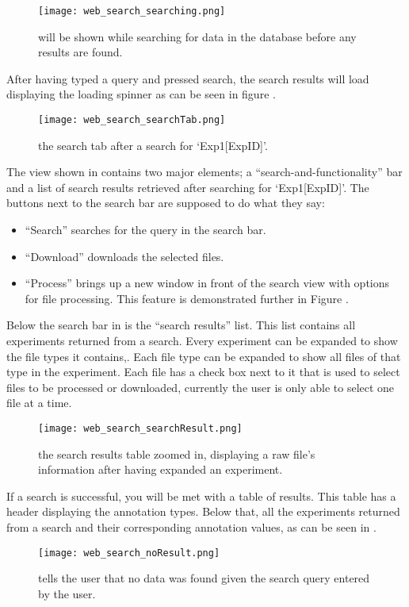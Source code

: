 \begin{figure}[h]
\centering
\texttt{[image: web\_search\_searching.png]}
\caption{\label{fig:web_search_searching}will be shown while searching for data in the database before any results are found.}
\end{figure}

After having typed a query and pressed search, the search results will load displaying the loading spinner as can be seen in figure .
\begin{figure}[h]
\centering
\texttt{[image: web\_search\_searchTab.png]}
\caption{\label{fig:web_search_searchTab}the search tab after a search for ‘Exp1[ExpID]’.}
\end{figure}

The view shown in  contains two major elements; a “search-and-functionality” bar and a list of search results retrieved after searching for ‘Exp1[ExpID]’. The buttons next to the search bar are supposed to do what they say: 
\begin{itemize}
	\item “Search” searches for the query in the search bar. 
	\item “Download” downloads the selected files. 
	\item “Process” brings up a new window in front of the search view with options for file processing. This feature is demonstrated further in Figure .
\end{itemize}

Below the search bar in  is the “search results” list. This list contains all experiments returned from a search. Every experiment can be expanded to show the file types it contains,. Each file type can be expanded to show all files of that type in the experiment. Each file has a check box next to it that is used to select files to be processed or downloaded, currently the user is only able to select one file at a time. 
\begin{figure}[h]
\centering
\texttt{[image: web\_search\_searchResult.png]}
\caption{\label{fig:web_search_searchResult}the search results table zoomed in, displaying a raw file’s information after having expanded an experiment.}
\end{figure}

If a search is successful, you will be met with a table of results. This table has a header displaying the annotation types. Below that, all the experiments returned from a search and their corresponding annotation values, as can be seen in .
\begin{figure}[h]
\centering
\texttt{[image: web\_search\_noResult.png]}
\caption{\label{fig:web_search_noResult}tells the user that no data was found given the search query entered by the user.}
\end{figure}

